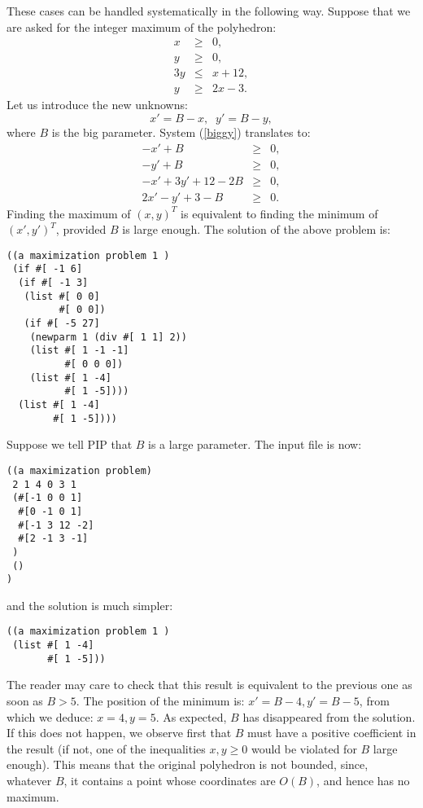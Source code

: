 \documentclass[12pt,a4paper,dvips]{article}
\begin{document}
These cases can be handled systematically in the following way. Suppose that
we are asked for the integer maximum of the polyhedron:
\begin{eqnarray}
x & \ge & 0, \nonumber \\
y & \ge & 0, \label{biggy}\\
3 y & \le & x + 12, \nonumber\\
y & \ge & 2 x - 3. \nonumber
\end{eqnarray}
Let us introduce the new unknowns:
\[ x'= B - x, \;\; y' = B - y ,\]
where $B$ is the big parameter. System (\ref{biggy}) translates to:
\begin{eqnarray*}
-x' + B & \ge & 0,\\
-y' + B & \ge & 0,\\
-x' + 3y' + 12 - 2B & \ge & 0,\\
2x' - y' + 3 - B & \ge & 0. 
\end{eqnarray*}
Finding the maximum of $(x,y)^T$ is equivalent to finding the minimum of
$(x', y')^T$, provided $B$ is large enough. The solution of the above
problem is:
\begin{verbatim}
((a maximization problem 1 )
 (if #[ -1 6]
  (if #[ -1 3]
   (list #[ 0 0]
         #[ 0 0])
   (if #[ -5 27]
    (newparm 1 (div #[ 1 1] 2))
    (list #[ 1 -1 -1]
          #[ 0 0 0])
    (list #[ 1 -4]
          #[ 1 -5])))
  (list #[ 1 -4]
        #[ 1 -5])))
\end{verbatim}

Suppose we tell PIP that $B$ is a large parameter. The input file is
now:
\begin{verbatim}
((a maximization problem)
 2 1 4 0 3 1
 (#[-1 0 0 1]
  #[0 -1 0 1]
  #[-1 3 12 -2]
  #[2 -1 3 -1]
 )
 ()
)
\end{verbatim}
and the solution is much simpler:
\begin{verbatim}
((a maximization problem 1 )
 (list #[ 1 -4]
       #[ 1 -5]))
\end{verbatim}
The reader may care to check that this result is equivalent to the
previous one as soon as $B > 5$. The position of the minimum is:
$x' = B - 4, y' = B - 5$, from which we deduce: $x = 4, y = 5$. As
expected, $B$ has disappeared from the solution. If this does not happen,
we observe first that $B$ must have a positive coefficient in the result
(if not, one of the inequalities $x, y \ge 0$ would be violated for $B$
large enough). This means that the original polyhedron is not bounded,
since, whatever $B$, it contains a point whose coordinates are $O(B)$,
and hence has no maximum.
\end{document}
